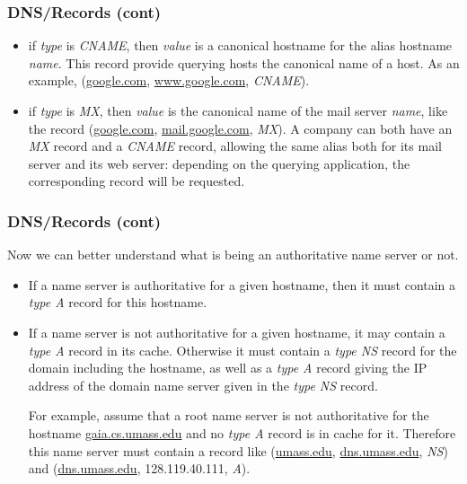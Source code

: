 %
\begin{frame}
\frametitle{DNS/Records (cont)}

\begin{itemize}

  \item if \emph{type} is \emph{CNAME}, then \emph{value} is a
  canonical hostname for the alias hostname \emph{name}. This record
  provide querying hosts the canonical name of a host. As an example,
  (\url{google.com}, \url{www.google.com}, \emph{CNAME}).

  \item if \emph{type} is \emph{MX}, then \emph{value} is the
  canonical name of the mail server \emph{name}, like the record
  (\url{google.com}, \url{mail.google.com}, \emph{MX}). A company can
  both have an \emph{MX} record and a \emph{CNAME} record, allowing
  the same alias both for its mail server and its web server:
  depending on the querying application, the corresponding record will
  be requested.

\end{itemize}

\end{frame}

%
\begin{frame}
\frametitle{DNS/Records (cont)}

Now we can better understand what is being an authoritative name
server or not.

\begin{itemize}

  \item If a name server is authoritative for a given hostname, then
  it must contain a \emph{type A} record for this hostname.

  \item If a name server is not authoritative for a given hostname,
  it may contain a \emph{type A} record in its cache. Otherwise it
  must contain a \emph{type NS} record for the domain including the
  hostname, as well as a \emph{type A} record giving the IP address of
  the domain name server given in the \emph{type NS} record.

  For example, assume that a root name server is not authoritative for
  the hostname \url{gaia.cs.umass.edu} and no \emph{type A} record is
  in cache for it. Therefore this name server must contain a record
  like (\url{umass.edu}, \url{dns.umass.edu}, \emph{NS}) and
  (\url{dns.umass.edu}, 128.119.40.111, \emph{A}).

\end{itemize}


\end{frame}

